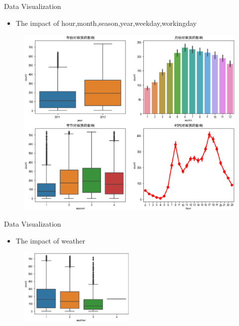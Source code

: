 \documentclass[
 size=14pt,
 paper=smartboard,  %
 mode=present, 		%
 display=slides, 	%
 style=tuliplab,  	%
 pauseslide,
 fleqn,leqno]{powerdot}
\begin{document}
\begin{slide}[toc=,bm=]{Data  Visualization}
  \begin{center}

    {
      \begin{itemize}
          \item The impact of hour,month,season,year,weekday,workingday
      \end{itemize} 
        \begin{figure}
          \centering
          \includegraphics[height=0.5\textwidth]{pic/count all.eps}
          \centering
        \end{figure} 
    }
    \end{center}
 


\end{slide}
\begin{slide}[toc=,bm=]{Data  Visualization}
  \begin{center}

    {
      \begin{itemize}
        
          \item The impact of weather
      \end{itemize} 
        \begin{figure}
          \centering
          \includegraphics[width=0.5\textwidth]{pic/weather.eps}
          \centering
        \end{figure} 
    }
    \end{center}
 


\end{slide}
\end{document}
